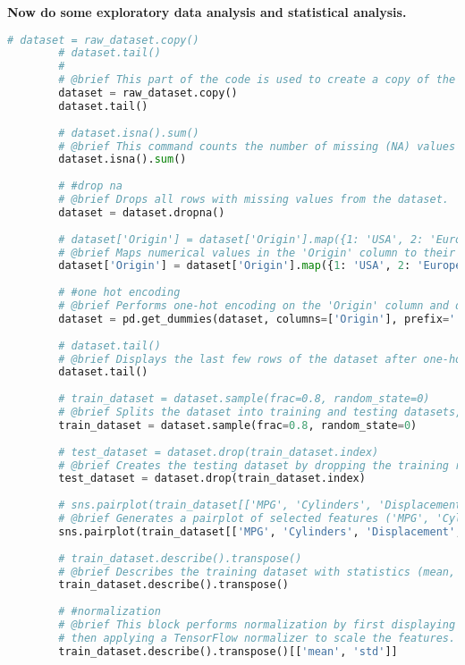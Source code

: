 	\pagebreak
	\textbf{Now do some exploratory data analysis and statistical analysis.}
	\begin{lstlisting}[language=Python]
		# dataset = raw_dataset.copy()
		# dataset.tail()
		#
		# @brief This part of the code is used to create a copy of the raw dataset and display the last few rows.
		dataset = raw_dataset.copy()
		dataset.tail()
		
		# dataset.isna().sum()
		# @brief This command counts the number of missing (NA) values in each column of the dataset.
		dataset.isna().sum()
		
		# #drop na
		# @brief Drops all rows with missing values from the dataset.
		dataset = dataset.dropna()
		
		# dataset['Origin'] = dataset['Origin'].map({1: 'USA', 2: 'Europe', 3: 'Japan'})
		# @brief Maps numerical values in the 'Origin' column to their respective string categories.
		dataset['Origin'] = dataset['Origin'].map({1: 'USA', 2: 'Europe', 3: 'Japan'})
		
		# #one hot encoding
		# @brief Performs one-hot encoding on the 'Origin' column and drops the prefix.
		dataset = pd.get_dummies(dataset, columns=['Origin'], prefix='', prefix_sep='')
		
		# dataset.tail()
		# @brief Displays the last few rows of the dataset after one-hot encoding.
		dataset.tail()
		
		# train_dataset = dataset.sample(frac=0.8, random_state=0)
		# @brief Splits the dataset into training and testing datasets, with 80% for training.
		train_dataset = dataset.sample(frac=0.8, random_state=0)
		
		# test_dataset = dataset.drop(train_dataset.index)
		# @brief Creates the testing dataset by dropping the training rows.
		test_dataset = dataset.drop(train_dataset.index)
		
		# sns.pairplot(train_dataset[['MPG', 'Cylinders', 'Displacement', 'Weight']], diag_kind='kde')
		# @brief Generates a pairplot of selected features ('MPG', 'Cylinders', 'Displacement', 'Weight') for visual exploration.
		sns.pairplot(train_dataset[['MPG', 'Cylinders', 'Displacement', 'Weight']], diag_kind='kde')
		
		# train_dataset.describe().transpose()
		# @brief Describes the training dataset with statistics (mean, std, etc.) and transposes the output for easier readability.
		train_dataset.describe().transpose()
		
		# #normalization
		# @brief This block performs normalization by first displaying the mean and std of the dataset, 
		# then applying a TensorFlow normalizer to scale the features.
		train_dataset.describe().transpose()[['mean', 'std']]
		

\end{lstlisting}
